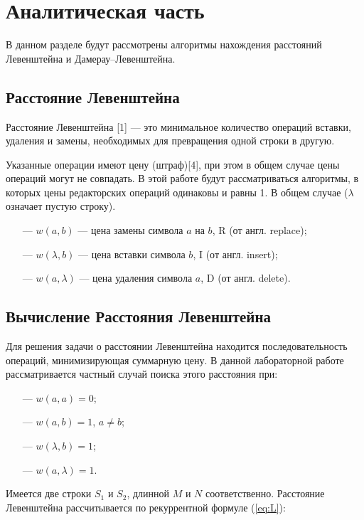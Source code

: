 \documentclass[a4paper,14pt, unknownkeysallowed]{extreport}
\begin{document}
\chapter{Аналитическая часть}

В данном разделе будут рассмотрены алгоритмы нахождения расстояний Левенштейна и Дамерау--Левенштейна.

\section{Расстояние Левенштейна}

Расстояние Левенштейна [1] --- это минимальное количество операций вставки, удаления и замены, необходимых для превращения одной строки в другую.

Указанные операции имеют цену (штраф)[4], при этом в общем случае цены операций могут не совпадать. В этой работе будут рассматриваться алгоритмы, в которых цены редакторских операций одинаковы и равны 1.
В общем случае ($\lambda$ означает пустую строку).

\begin{itemize}
	\item[---] $w(a, b)$ --- цена замены символа $a$ на $b$, R (от англ. replace);
	\item[---] $w(\lambda, b)$ --- цена вставки символа $b$, I (от англ. insert);
	\item[---] $w(a, \lambda)$ --- цена удаления символа $a$, D (от англ. delete).
\end{itemize}

\section{Вычисление Расстояния Левенштейна}
Для решения задачи о расстоянии Левенштейна находится последовательность операций, минимизирующая суммарную цену. В данной лабораторной работе рассматривается частный случай поиска этого расстояния при:

\begin{itemize}
	\item[---] $w(a, a) = 0$;
	\item[---] $w(a, b) = 1$, $a \neq b$;
	\item[---] $w(\lambda, b) = 1$;
	\item[---] $w(a, \lambda) = 1$.
\end{itemize}

Имеется две строки $S_{1}$ и $S_{2}$, длинной $M$ и $N$ соответственно. Расстояние Левенштейна рассчитывается по рекуррентной формуле (\ref{eq:L}):
\end{document}
